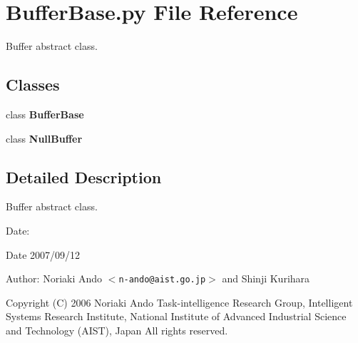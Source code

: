 \section{Buffer\-Base.py File Reference}
\label{BufferBase_8py}
Buffer abstract class. 

\subsection*{Classes}
\begin{CompactItemize}
\item 
class {\bf Buffer\-Base}
\item 
class {\bf Null\-Buffer}
\end{CompactItemize}


\subsection{Detailed Description}
Buffer abstract class. 

\begin{Desc}
\item[Date:]\begin{Desc}
\item[Date]2007/09/12 \end{Desc}
\end{Desc}
\begin{Desc}
\item[Author:]Noriaki Ando $<${\tt n-ando@aist.go.jp}$>$ and Shinji Kurihara\end{Desc}
Copyright (C) 2006 Noriaki Ando Task-intelligence Research Group, Intelligent Systems Research Institute, National Institute of Advanced Industrial Science and Technology (AIST), Japan All rights reserved.